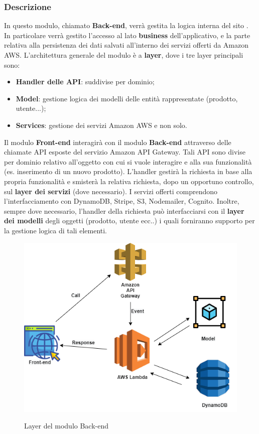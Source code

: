 \subsubsection{Descrizione}
In questo modulo, chiamato \textbf{Back-end}, verrà gestita la logica interna del sito \nameproject. In particolare verrà gestito l'accesso al lato \textbf{business} dell'applicativo, e la parte relativa alla persistenza dei dati salvati all'interno dei servizi offerti da Amazon AWS. L'architettura generale del modulo è a \textbf{layer}, dove i tre layer principali sono:
\begin{itemize}
	\item \textbf{Handler delle API}: suddivise per dominio;
	\item \textbf{Model}: gestione logica dei modelli delle entità rappresentate (prodotto, utente...);
	\item \textbf{Services}: gestione dei servizi Amazon AWS e non solo.
\end{itemize} Il modulo \textbf{Front-end} interagirà con il modulo \textbf{Back-end} attraverso delle chiamate API esposte del servizio Amazon API Gateway. Tali API sono divise per dominio relativo all'oggetto con cui si vuole interagire e alla sua funzionalità (es. inserimento di un nuovo prodotto). L'handler gestirà la richiesta in base alla propria funzionalità e smisterà la relativa richiesta, dopo un opportuno controllo, sul \textbf{layer dei servizi} (dove necessario). I servizi offerti comprendono l'interfacciamento con DynamoDB, Stripe, S3, Nodemailer, Cognito. Inoltre, sempre dove necessario, l'handler della richiesta può interfacciarsi con il \textbf{layer dei modelli} degli oggetti (prodotto, utente ecc..) i quali forniranno supporto per la gestione logica di tali elementi.

\begin{figure}[H]
\centering
\includegraphics[scale=0.65]{res/Architettura/Backend/img/layerBack-end.png}\\
\caption{Layer del modulo Back-end}
\end{figure}